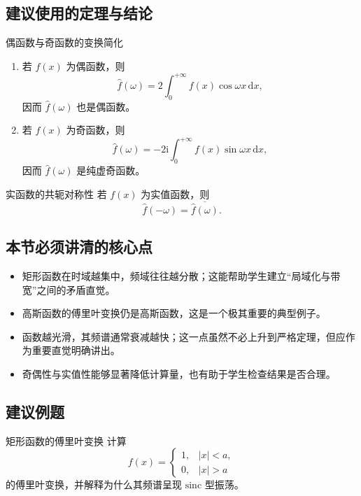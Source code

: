 \subsection*{建议使用的定理与结论}
\begin{dingli}{偶函数与奇函数的变换简化}{}
\begin{enumerate}
    \item 若 $f(x)$ 为偶函数，则
    \[
        \hat{f}(\omega)=2\int_{0}^{+\infty} f(x)\cos \omega x\,\mathrm{d}x,
    \]
    因而 $\hat{f}(\omega)$ 也是偶函数。
    \item 若 $f(x)$ 为奇函数，则
    \[
        \hat{f}(\omega)=-2\mathrm{i}\int_{0}^{+\infty} f(x)\sin \omega x\,\mathrm{d}x,
    \]
    因而 $\hat{f}(\omega)$ 是纯虚奇函数。
\end{enumerate}
\end{dingli}

\begin{dingli}{实函数的共轭对称性}{}
若 $f(x)$ 为实值函数，则
\[
    \hat{f}(-\omega)=\overline{\hat{f}(\omega)}.
\]
\end{dingli}

\subsection*{本节必须讲清的核心点}
\begin{itemize}
    \item 矩形函数在时域越集中，频域往往越分散；这能帮助学生建立``局域化与带宽''之间的矛盾直觉。
    \item 高斯函数的傅里叶变换仍是高斯函数，这是一个极其重要的典型例子。
    \item 函数越光滑，其频谱通常衰减越快；这一点虽然不必上升到严格定理，但应作为重要直觉明确讲出。
    \item 奇偶性与实值性能够显著降低计算量，也有助于学生检查结果是否合理。
\end{itemize}

\subsection*{建议例题}
\begin{lizi}{矩形函数的傅里叶变换}{}
计算
\[
    f(x)=
    \begin{cases}
        1, & |x|<a, \\
        0, & |x|>a
    \end{cases}
\]
的傅里叶变换，并解释为什么其频谱呈现 $\mathrm{sinc}$ 型振荡。
\end{lizi}

